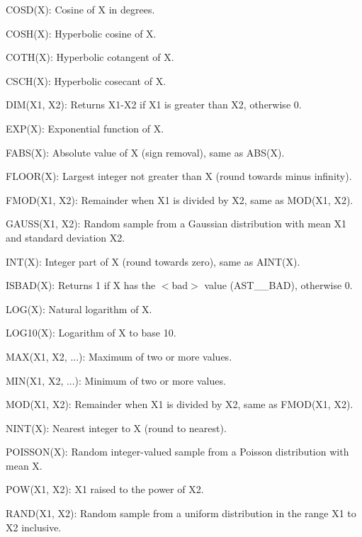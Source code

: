 \documentclass[twoside,11pt]{article}
\begin{document}
{{{         \sstitem
         COSD(X): Cosine of X in degrees.

         \sstitem
         COSH(X): Hyperbolic cosine of X.

         \sstitem
         COTH(X): Hyperbolic cotangent of X.

         \sstitem
         CSCH(X): Hyperbolic cosecant of X.

         \sstitem
         DIM(X1, X2): Returns X1-X2 if X1 is greater than X2, otherwise 0.

         \sstitem
         EXP(X): Exponential function of X.

         \sstitem
         FABS(X): Absolute value of X (sign removal), same as ABS(X).

         \sstitem
         FLOOR(X): Largest integer not greater than X (round towards
           minus infinity).

         \sstitem
         FMOD(X1, X2): Remainder when X1 is divided by X2, same as
           MOD(X1, X2).

         \sstitem
         GAUSS(X1, X2): Random sample from a Gaussian distribution with mean
           X1 and standard deviation X2.

         \sstitem
         INT(X): Integer part of X (round towards zero), same as AINT(X).

         \sstitem
         ISBAD(X): Returns 1 if X has the $<$bad$>$ value (AST\_\_BAD), otherwise 0.

         \sstitem
         LOG(X): Natural logarithm of X.

         \sstitem
         LOG10(X): Logarithm of X to base 10.

         \sstitem
         MAX(X1, X2, ...): Maximum of two or more values.

         \sstitem
         MIN(X1, X2, ...): Minimum of two or more values.

         \sstitem
         MOD(X1, X2): Remainder when X1 is divided by X2, same as
           FMOD(X1, X2).

         \sstitem
         NINT(X): Nearest integer to X (round to nearest).

         \sstitem
         POISSON(X): Random integer-valued sample from a Poisson
           distribution with mean X.

         \sstitem
         POW(X1, X2): X1 raised to the power of X2.

         \sstitem
         RAND(X1, X2): Random sample from a uniform distribution in the
           range X1 to X2 inclusive.

}}}
\end{document}
